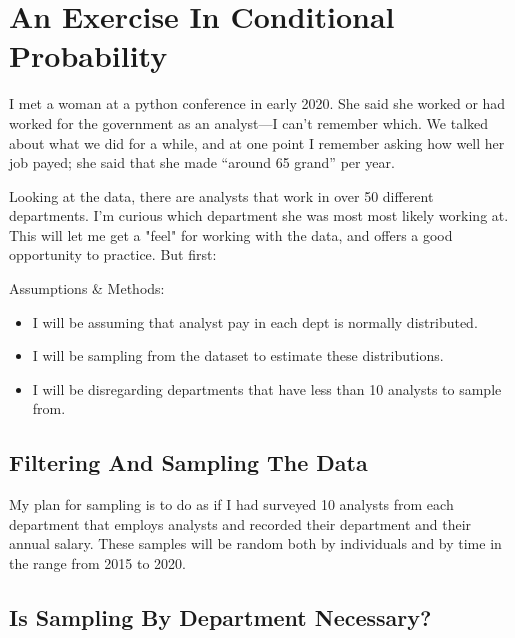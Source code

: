 \documentclass[letterpaper]{article}
\theoremstyle{definition}
\begin{document}
    

\hypertarget{getting-my-feet-wet-creeping-on-people-i-met-once}{ 
	\section{An Exercise In Conditional Probability}
	\label{getting-my-feet-wet-creeping-on-people-i-met-once}}

I met a woman at a python conference in early 2020. She said she worked
or had worked for the government as an analyst---I can't remember which.
We talked about what we did for a while, and at one point I remember asking how well her job
payed; she said that she made ``around 65 grand'' per year.

Looking at the data, there are analysts that work in over 50 different departments. I'm
curious which department she was most most likely working at. This will let me get a
"feel" for working with the data, and offers a good opportunity to practice. But first:

\large{Assumptions \& Methods:}
\begin{itemize}
\item
	I will be assuming that analyst pay in each dept is normally distributed.
\item
	I will be sampling from the dataset to estimate these distributions.
\item
	I will be disregarding departments that have less than 10 analysts to sample from.
\end{itemize}

    \hypertarget{step-1-filter-the-data}{%
\subsection{Filtering And Sampling The Data}\label{step-1-filter-the-data}}

My plan for sampling is to do as if I had surveyed 10 analysts from each department
that employs analysts  and recorded their department and their annual salary. These
samples will be random both by individuals and by time in the range from 2015 to 2020. 


    \hypertarget{step-2-see-if-theres-even-a-difference-between-the-average-salaries-in-each-department}{%
\subsection{Is Sampling By Department Necessary?}\label{step-2-see-if-theres-even-a-difference-between-the-average-salaries-in-each-department}}
\end{document}
